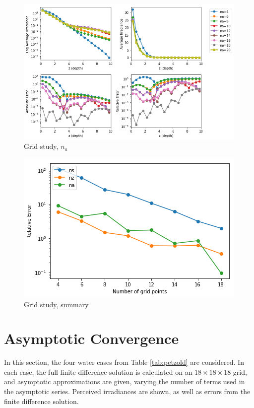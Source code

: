 \documentclass[ms,cpyr,lof,lot]{uathesis}
\begin{document}
\begin{figure}[H]
  \centering
  \includegraphics[width=5in]{gs_na_20}
  \caption{Grid study, $n_a$}
  \label{fig:gs_na}
\end{figure}

\begin{figure}[H]
  \centering
  \includegraphics[width=5in]{gs_20}
  \caption{Grid study, summary}
  \label{fig:gs_compare}
\end{figure}


\section{Asymptotic Convergence}
\label{sec:asym_conv}

In this section, the four water cases from Table \ref{tab:petzold} are considered.
In each case, the full finite difference solution is calculated on an $18 \times 18 \times 18$ grid,
and asymptotic approximations are given, varying the number of terms used in the asymptotic series.
Perceived irradiances are shown, as well as errors from the finite difference solution.
\end{document}
